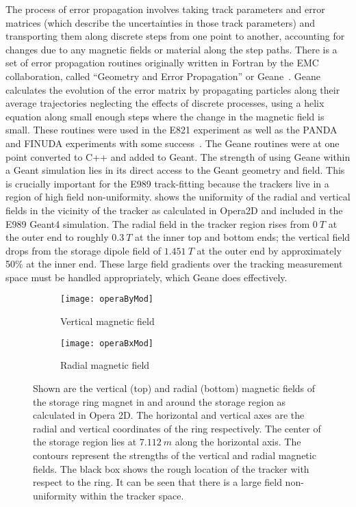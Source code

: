 The process of error propagation involves taking track parameters and error matrices (which describe the uncertainties in those track parameters) and transporting them along discrete steps from one point to another, accounting for changes due to any magnetic fields or material along the step paths. There is a set of error propagation routines originally written in Fortran by the EMC collaboration, called ``Geometry and Error Propagation'' or Geane~\cite{geanemanual}. Geane calculates the evolution of the error matrix by propagating particles along their average trajectories neglecting the effects of discrete processes, using a helix equation along small enough steps where the change in the magnetic field is small. These routines were used in the E821 experiment as well as the PANDA and FINUDA experiments with some success~\cite{Lavezzi}. The Geane routines were at one point converted to C++ and added to Geant. The strength of using Geane within a Geant simulation lies in its direct access to the Geant geometry and field. This is crucially important for the E989 track-fitting because the trackers live in a region of high field non-uniformity.  shows the uniformity of the radial and vertical fields in the vicinity of the tracker as calculated in Opera2D and included in the E989 Geant4 simulation. The radial field in the tracker region rises from $\SI{0}{T}$ at the outer end to roughly $\SI{0.3}{T}$ at the inner top and bottom ends; the vertical field drops from the storage dipole field of $\SI{1.451}{T}$ at the outer end by approximately 50\% at the inner end. These large field gradients over the tracking measurement space must be handled appropriately, which Geane does effectively. 


\begin{figure}
\centering
    \begin{subfigure}[]{0.75\textwidth}
        \centering
        \texttt{[image: operaByMod]}
        \caption{Vertical magnetic field}
    \label{fig:operaBy}
    \end{subfigure}%
    \vspace{5mm}
    \begin{subfigure}[]{0.75\textwidth}
        \centering
        \texttt{[image: operaBxMod]}
        \caption{Radial magnetic field}
    \label{fig:operaBx}
    \end{subfigure}
\caption[Vertical and radial magnetic fields calculated in Opera2D]{Shown are the vertical (top) and radial (bottom) magnetic fields of the storage ring magnet in and around the storage region as calculated in Opera 2D. The horizontal and vertical axes are the radial and vertical coordinates of the ring respectively. The center of the storage region lies at $\SI{7.112}{m}$ along the horizontal axis. The contours represent the strengths of the vertical and radial magnetic fields. The black box shows the rough location of the tracker with respect to the ring. It can be seen that there is a large field non-uniformity within the tracker space.}
\label{fig:Opera2DFields}
\end{figure}


